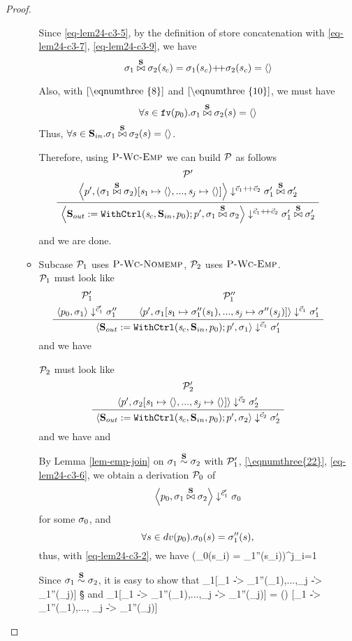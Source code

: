 \begin{proof}
\begin{itemize}
\begin{itemize}
   		Since \eqref{eq-lem24-c3-5}, by the definition of store concatenation with \eqref{eq-lem24-c3-7}, \eqref{eq-lem24-c3-9}, we have    		
   		$$\sgmx(\s_c) = \sgm_1(s_c) {\++} \sgm_2(s_c) =  \emptyv$$
   		
   		Also, with $\eqref{\eqnumthree{8}}$ and $\eqref{\eqnumthree{10}}$, we must have
   		$$\forall s \in \mathtt{fv}(p_0). \sigma_1 \stackrel{\mathbf{S}}{\bowtie} \sigma_2(s) = \langle \rangle $$
   		Thus, $\forall s \in \mathbf{S}_{in}. \sigma_1 \stackrel{\mathbf{S}}{\bowtie} \sigma_2(s) = \langle \rangle$. 
   		
   		Therefore, using $\textsc{P-Wc-Emp}$ we can build $\mathcal{P}$ as follows
   		$$\PT{
   			\UCN{\MP'}{\seval{p'}{(\sgmx) [\s_1 \|-> \emptyv,..., \s_j \|-> \emptyv]}{\cc }{\sgmpx} }
   			\UC{\seval{\casethree}{\sgmx}{\cc}{\sgmpx}}
   		}$$
   		
   		and we are done. \\
   
   	\item Subcase $\mathcal{P}_1$ uses  $\textsc{P-Wc-Nomemp}$, $\mathcal{P}_2$ uses $\textsc{P-Wc-Emp}$. \\
   	
   	$\mathcal{P}_1$ must look like
   	$$\PT{
   			\UCN{\MP_1'}{\seval{p_0}{\sgm_1}{\c_1'}{\sgm_1''}}
   			\UCN{\MP_1''}{\seval{p'}{\sgm_1[\s_1 \|-> \sgm_1''(\s_1),...,\s_j \|-> \sgm''(\s_j)]}{\c_1}{\sgm_1'}}
   			\BC{\seval{\casethree}{\sgm_1}{\c_1}{\sgm_1'}}
   	}$$
    and we have 
   	
   	$\mathcal{P}_2$ must look like	
   	$$\PT{
   		\UCN{\MP_2'}{\seval{p'}{\sgm_2[\s_1 \|-> \emptyv, ..., \s_j \|-> \emptyv]}{\c_2}{\sgm_2'}}
   		\UC{\seval{\casethree}{\sgm_2}{\c_2}{\sgm_2'}}
   	}$$
   	and we have     	
   	and 
 
 \def\sgmbpp#1{\sgm_{#1}[\s_1 \|-> \sgm_{#1}''(\s_1),...,\s_j \|-> \sgm_{#1}''(\s_j)]} 


    By Lemma \ref{lem-emp-join} on $\sigma_1 \stackrel{\mathbf{S}}{\sim} \sigma_2$ with $\mathcal{P}_1'$, \eqref{\eqnumthree{22}}, \eqref{eq-lem24-c3-6}, we obtain a derivation $\mathcal{P}_0$
    of 
    $$\left\langle p_0,\sigma_1 \stackrel{\mathbf{S}}{\bowtie} \sigma_2 \right\rangle \downarrow^{\vec c_1'} \sigma_0$$ for some $\sigma_0$, and 
    $$\forall s \in dv(p_0). \sigma_0(s) = \sigma_1''(s), $$
    thus,  with \eqref{eq-lem24-c3-2}, we have
     {(\sgm_0(s_i) = \sgm_1''(s_i))^j_{i=1}}
    


   		Since $\sigma_1 \stackrel{\mathbf{S}}{\sim} \sigma_2$, it is easy to show that
	   	{\sgmbpp{1} \~{\S} }
	   	and 
	   	{\sgmbpp{1} \x{\S}  = (\sgmx) [\s_1 \|-> \sgm_1''(\s_1),..., \s_j \|-> \sgm_1''(\s_j)]}
	   	

\end{itemize}
\end{itemize}
\end{proof}
